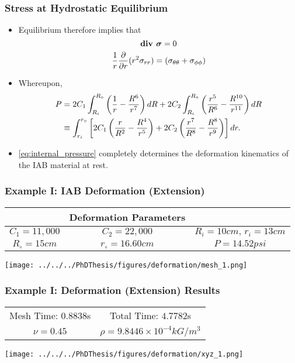 \begin{frame}
	\frametitle{Stress at Hydrostatic Equilibrium}
	\begin{itemize}
		\item Equilibrium therefore implies that %
		\[
		\textbf{div } \bm{\sigma} = 0
		\]
		\[
		\small
		\frac{1}{r}\frac{\partial}{\partial r}(r^2 \sigma_{rr}) = (\sigma_{\theta\theta}+ \sigma_{\phi \phi})
		\]
		\item Whereupon,
		\begin{align}
		\small
		P  &=  2 C_1\int_{R_i}^{R_\circ} 			\left(\frac{1}{r}-\frac{R^6}{r^{7}}\right)dR+2C_2\int_{R_i}^{R_\circ} \left(\frac{r^{5}}{R^6} - \frac{R^{10}}{r^{11}}\right)  dR \nonumber \\
			&\equiv \int_{r_i}^{r_\circ} \left[2 C_1\left(\frac{r}{R^2}-\frac{R^4}{r^{5}}\right)+2 C_2\left(\frac{r^{7}}{R^8} - \frac{R^{8}}{r^{9}}\right)\right]  dr. %
		\label{eq:internal_pressure}
		\end{align}
		\item \eqref{eq:internal_pressure} completely determines the deformation kinematics of the IAB material at rest. 
	\end{itemize}
\end{frame}

\begin{frame}
	\frametitle{Example I: IAB Deformation (Extension)}
	\centering
		\begin{tabular}{@{}c@{}c@{}c@{}}
		\toprule
		& Deformation Parameters & \\
		\midrule
		$C_1=11,000$ &  $C_2 = 22,000$ & $R_i = 10cm, \, r_i = 13cm$ \\
		$R_\circ = 15cm$ & $r_\circ = 16.60cm$ &  $P = 14.52 psi$  
		\\
		\midrule
		\bottomrule
	\end{tabular}
	\centering
	\texttt{[image: ../../../PhDThesis/figures/deformation/mesh\_1.png]}
\centering 
\end{frame}


\begin{frame}
\frametitle{Example I: Deformation (Extension) Results}
	\centering
	\begin{tabular}{@{}c|@{}|c@{}}
		\toprule
		\midrule 
		Mesh Time: $0.8838$s  & Total Time: $4.7782$s \\
		$\nu=0.45$ & $\rho = 9.8446\times 10^{-4} kG/m^3$ 
		\\
		\midrule
		\bottomrule
	\end{tabular}
\texttt{[image: ../../../PhDThesis/figures/deformation/xyz\_1.png]}
\end{frame}

